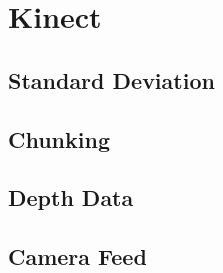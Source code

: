 \section{Kinect}

\subsection{Standard Deviation}

\subsection{Chunking}

\subsection{Depth Data}

\subsection{Camera Feed}

\pagestyle{euan}













